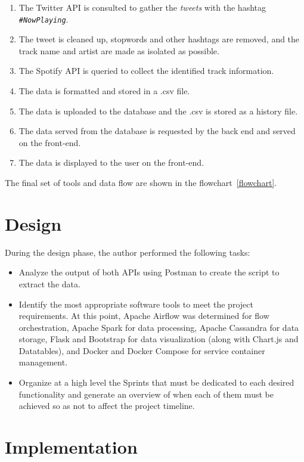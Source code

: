 \begin{enumerate}
	\item The Twitter API is consulted to gather the \textit{tweets} with the hashtag \texttt{\textit{\#NowPlaying}}.
	\item The tweet is cleaned up, stopwords and other hashtags are removed, and the track name and artist are made as isolated as possible.
	\item The Spotify API is queried to collect the identified track information.
	\item The data is formatted and stored in a .csv file.
	\item The data is uploaded to the database and the .csv is stored as a history file.
	\item The data served from the database is requested by the back end and served on the front-end.
	\item The data is displayed to the user on the front-end.
\end{enumerate}

\nonzeroparskip The final set of tools and data flow are shown in the flowchart~\ref{flowchart}. 

\section{Design}

\nonzeroparskip During the design phase, the author performed the following tasks:
\begin{itemize}
	\item Analyze the output of both APIs using Postman to create the script to extract the data.
	\item Identify the most appropriate software tools to meet the project requirements. At this point, Apache Airflow was determined for flow orchestration, Apache Spark for data processing, Apache Cassandra for data storage, Flask and Bootstrap for data visualization (along with Chart.js and Datatables), and Docker and Docker Compose for service container management.
	\item Organize at a high level the Sprints that must be dedicated to each desired functionality and generate an overview of when each of them must be achieved so as not to affect the project timeline.
\end{itemize}

\section{Implementation}


